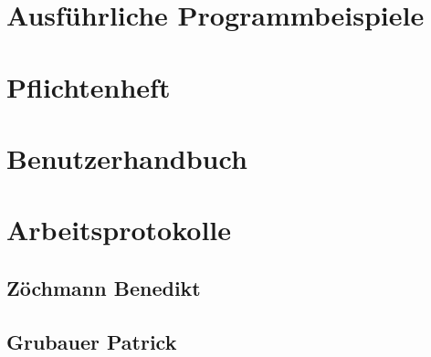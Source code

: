 \documentclass[12pt,a4paper,twoside,openany]{report}
\begin{document}
\chapter{Ausführliche Programmbeispiele \MjAnnotation{}}\label{sec:apdx:extendedcode}
{

}

\chapter{Pflichtenheft}



\chapter{Benutzerhandbuch}
{

\newpage

}



\chapter{Arbeitsprotokolle}
{
\section{Zöchmann Benedikt}

}
\newpage

{
\section{Grubauer Patrick}
 
}

\newpage
{

}
\end{document}
